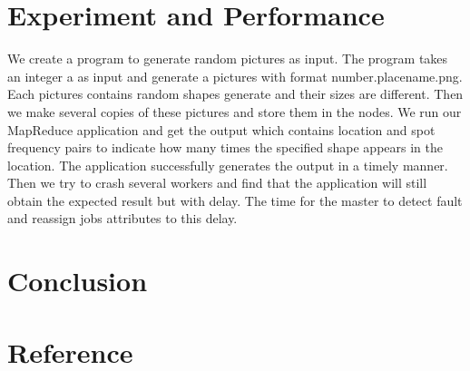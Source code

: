 \documentclass[12pt]{article}
\begin{document}
\section{Experiment and Performance }

We create a program to generate random pictures as input. The program takes an integer a as input and generate a pictures with format number.placename.png.  Each pictures contains random shapes generate and their sizes are different. Then we make several copies of these pictures and store them in the nodes. We run our MapReduce application and get the output which contains location and spot frequency pairs to indicate how many times the specified shape appears in the location. The application successfully generates the output in a timely manner. Then we try to crash several workers and find that the application will still obtain the expected result but with delay. The time for the master to detect fault and reassign jobs attributes to this delay.
  
\section {Conclusion}

\section*{Reference}
\end{document}
